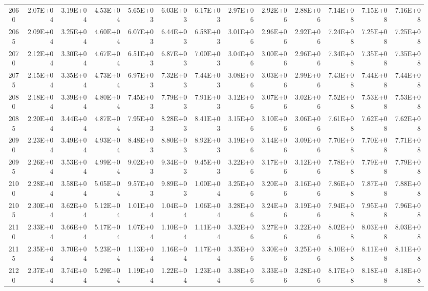 \documentclass{article}
\begin{document}
\begin{table}
\begin{tabular}{crrr|rrr|rrr|rrr}
2060     & 2.07E+04   & 3.19E+04   & 4.53E+04   & 5.65E+03   & 6.03E+03   & 6.17E+03   & 2.97E+06   & 2.92E+06   & 2.88E+06   & 7.14E+08   & 7.15E+08   & 7.16E+08   \\
2065     & 2.09E+04   & 3.25E+04   & 4.60E+04   & 6.07E+03   & 6.44E+03   & 6.58E+03   & 3.01E+06   & 2.96E+06   & 2.92E+06   & 7.24E+08   & 7.25E+08   & 7.25E+08   \\
2070     & 2.12E+04   & 3.30E+04   & 4.67E+04   & 6.51E+03   & 6.87E+03   & 7.00E+03   & 3.04E+06   & 3.00E+06   & 2.96E+06   & 7.34E+08   & 7.35E+08   & 7.35E+08   \\
2075     & 2.15E+04   & 3.35E+04   & 4.73E+04   & 6.97E+03   & 7.32E+03   & 7.44E+03   & 3.08E+06   & 3.03E+06   & 2.99E+06   & 7.43E+08   & 7.44E+08   & 7.44E+08   \\
2080     & 2.18E+04   & 3.39E+04   & 4.80E+04   & 7.45E+03   & 7.79E+03   & 7.91E+03   & 3.12E+06   & 3.07E+06   & 3.02E+06   & 7.52E+08   & 7.53E+08   & 7.53E+08   \\
2085     & 2.20E+04   & 3.44E+04   & 4.87E+04   & 7.95E+03   & 8.28E+03   & 8.41E+03   & 3.15E+06   & 3.10E+06   & 3.06E+06   & 7.61E+08   & 7.62E+08   & 7.62E+08   \\
2090     & 2.23E+04   & 3.49E+04   & 4.93E+04   & 8.48E+03   & 8.80E+03   & 8.92E+03   & 3.19E+06   & 3.14E+06   & 3.09E+06   & 7.70E+08   & 7.70E+08   & 7.71E+08   \\
2095     & 2.26E+04   & 3.53E+04   & 4.99E+04   & 9.02E+03   & 9.34E+03   & 9.45E+03   & 3.22E+06   & 3.17E+06   & 3.12E+06   & 7.78E+08   & 7.79E+08   & 7.79E+08   \\
2100     & 2.28E+04   & 3.58E+04   & 5.05E+04   & 9.57E+03   & 9.89E+03   & 1.00E+04   & 3.25E+06   & 3.20E+06   & 3.16E+06   & 7.86E+08   & 7.87E+08   & 7.88E+08   \\
2105     & 2.30E+04   & 3.62E+04   & 5.12E+04   & 1.01E+04   & 1.04E+04   & 1.06E+04   & 3.28E+06   & 3.24E+06   & 3.19E+06   & 7.94E+08   & 7.95E+08   & 7.96E+08   \\
2110     & 2.33E+04   & 3.66E+04   & 5.17E+04   & 1.07E+04   & 1.10E+04   & 1.11E+04   & 3.32E+06   & 3.27E+06   & 3.22E+06   & 8.02E+08   & 8.03E+08   & 8.03E+08   \\
2115     & 2.35E+04   & 3.70E+04   & 5.23E+04   & 1.13E+04   & 1.16E+04   & 1.17E+04   & 3.35E+06   & 3.30E+06   & 3.25E+06   & 8.10E+08   & 8.11E+08   & 8.11E+08   \\
2120     & 2.37E+04   & 3.74E+04   & 5.29E+04   & 1.19E+04   & 1.22E+04   & 1.23E+04   & 3.38E+06   & 3.33E+06   & 3.28E+06   & 8.17E+08   & 8.18E+08   & 8.18E+08   \\

\end{tabular}
\end{table}
\end{document}
